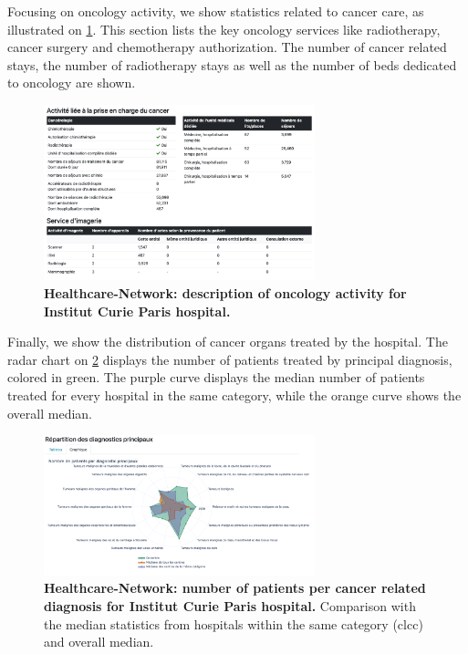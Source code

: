 Focusing on oncology activity, we show statistics related to cancer care, as illustrated on \cref{fig:hn-curie-cancero}. This section lists the key oncology services like radiotherapy, cancer surgery and chemotherapy authorization. The number of cancer related stays, the number of radiotherapy stays as well as the number of beds dedicated to oncology are shown.

\begin{figure}[H]
    \includegraphics[width=0.7\textwidth]{images/healthcare-network/curie-cancero.png}
    \centering
    \caption{
        \textbf{Healthcare-Network: description of oncology activity for Institut Curie Paris hospital.}
    }
    \label{fig:hn-curie-cancero}
\end{figure}

Finally, we show the distribution of cancer organs treated by the hospital. The radar chart on \cref{fig:hn-curie-dp} displays the number of patients treated by principal diagnosis, colored in green. The purple curve displays the median number of patients treated for every hospital in the same category, while the orange curve shows the overall median.

\begin{figure}[H]
    \includegraphics[width=0.7\textwidth]{images/healthcare-network/curie-dp.png}
    \centering
    \caption{
        \textbf{Healthcare-Network: number of patients per cancer related diagnosis for Institut Curie Paris hospital.} Comparison with the median statistics from hospitals within the same category (\ac{clcc}) and overall median.
    }
    \label{fig:hn-curie-dp}
\end{figure}

